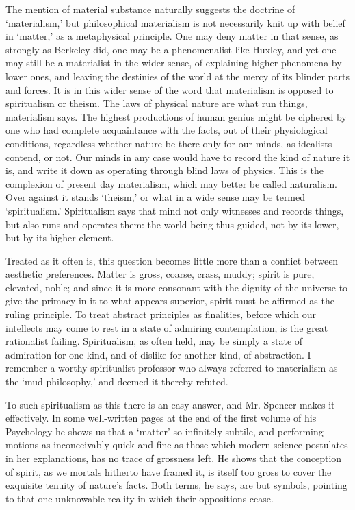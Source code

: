 \documentclass[]{article}
\begin{document}
The mention of material substance naturally suggests the doctrine of `materialism,' but philosophical materialism is not necessarily knit up with belief in `matter,' as a metaphysical principle. One may deny matter in that sense, as strongly as Berkeley did, one may be a phenomenalist like Huxley, and yet one may still be a materialist in the wider sense, of explaining higher phenomena by lower ones, and leaving the destinies of the world at the mercy of its blinder parts and forces. It is in this wider sense of the word that materialism is opposed to spiritualism or theism. The laws of physical nature are what run things, materialism says. The highest productions of human genius might be ciphered by one who had complete acquaintance with the facts, out of their physiological conditions, regardless whether nature be there only for our minds, as idealists contend, or not. Our minds in any case would have to record the kind of nature it is, and write it down as operating through blind laws of physics. This is the complexion of present day materialism, which may better be called naturalism. Over against it stands `theism,' or what in a wide sense may be termed `spiritualism.' Spiritualism says that mind not only witnesses and records things, but also runs and operates them: the world being thus guided, not by its lower, but by its higher element.

Treated as it often is, this question becomes little more than a conflict between aesthetic preferences. Matter is gross, coarse, crass, muddy; spirit is pure, elevated, noble; and since it is more consonant with the dignity of the universe to give the primacy in it to what appears superior, spirit must be affirmed as the ruling principle. To treat abstract principles as finalities, before which our intellects may come to rest in a state of admiring contemplation, is the great rationalist failing. Spiritualism, as often held, may be simply a state of admiration for one kind, and of dislike for another kind, of abstraction. I remember a worthy spiritualist professor who always referred to materialism as the `mud-philosophy,' and deemed it thereby refuted.

To such spiritualism as this there is an easy answer, and Mr. Spencer makes it effectively. In some well-written pages at the end of the first volume of his Psychology he shows us that a `matter' so infinitely subtile, and performing motions as inconceivably quick and fine as those which modern science postulates in her explanations, has no trace of grossness left. He shows that the conception of spirit, as we mortals hitherto have framed it, is itself too gross to cover the exquisite tenuity of nature's facts. Both terms, he says, are but symbols, pointing to that one unknowable reality in which their oppositions cease.
\end{document}
